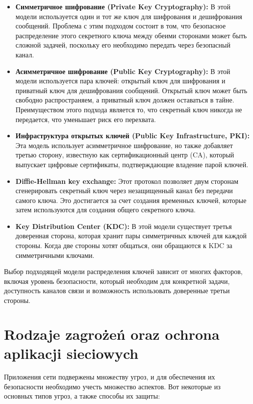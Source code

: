 \begin{itemize}
\item \textbf{Симметричное шифрование (Private Key Cryptography):} В этой модели используется один и тот же ключ для шифрования и дешифрования сообщений. Проблема с этим подходом состоит в том, что безопасное распределение этого секретного ключа между обеими сторонами может быть сложной задачей, поскольку его необходимо передать через безопасный канал.

\item \textbf{Асимметричное шифрование (Public Key Cryptography):} В этой модели используется пара ключей: открытый ключ для шифрования и приватный ключ для дешифрования сообщений. Открытый ключ может быть свободно распространяем, а приватный ключ должен оставаться в тайне. Преимуществом этого подхода является то, что секретный ключ никогда не передается, что уменьшает риск его перехвата.

\item \textbf{Инфраструктура открытых ключей (Public Key Infrastructure, PKI):} Эта модель использует асимметричное шифрование, но также добавляет третью сторону, известную как сертификационный центр (CA), который выпускает цифровые сертификаты, подтверждающие владение парой ключей.

\item \textbf{Diffie-Hellman key exchange:} Этот протокол позволяет двум сторонам сгенерировать секретный ключ через незащищенный канал без передачи самого ключа. Это достигается за счет создания временных ключей, которые затем используются для создания общего секретного ключа.

\item \textbf{Key Distribution Center (KDC):} В этой модели существует третья доверенная сторона, которая хранит пары симметричных ключей для каждой стороны. Когда две стороны хотят общаться, они обращаются к KDC за симметричными ключами.
\end{itemize}

Выбор подходящей модели распределения ключей зависит от многих факторов, включая уровень безопасности, который необходим для конкретной задачи, доступность каналов связи и возможность использовать доверенные третьи стороны.

\section{Rodzaje zagrożeń oraz ochrona aplikacji sieciowych}

Приложения сети подвержены множеству угроз, и для обеспечения их безопасности необходимо учесть множество аспектов. Вот некоторые из основных типов угроз, а также способы их защиты:

